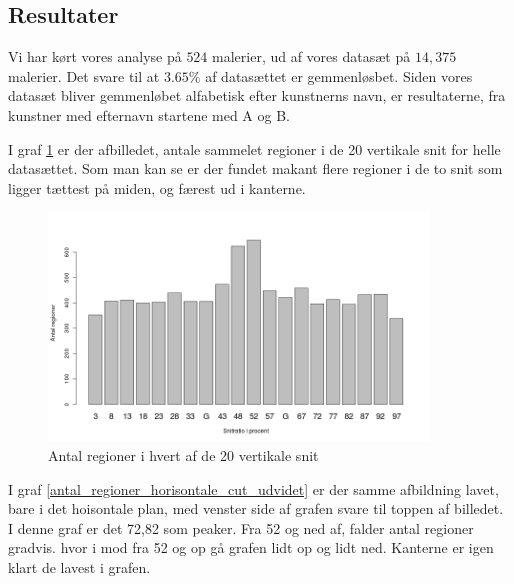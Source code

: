 \subsection{Resultater}
Vi har kørt vores analyse på $524$ malerier, ud af vores datasæt på
$14,375$ malerier. Det svare til at $3.65 \%$ af datasættet er
gemmenløsbet. Siden vores datasæt bliver gemmenløbet alfabetisk efter
kunstnerns navn, er resultaterne, fra kunstner med efternavn startene med A
og B.


I graf \ref{antal_regioner_vertikale_cut_udvidet} er der afbilledet,
antale sammelet regioner i de 20 vertikale snit for helle datasættet.
Som man kan se er der fundet makant flere regioner i de to snit som
ligger tættest på miden, og færest ud i kanterne. 

\begin{figure}[h!]
	\begin{center}
		\includegraphics[width=0.9\textwidth]{afsnit/resultater/billeder/cut0cut1eatsperratioU.png}
	\end{center}
	\caption{Antal regioner i hvert af de 20 vertikale snit}
	\label{antal_regioner_vertikale_cut_udvidet}
\end{figure}

I graf \ref{antal_regioner_horisontale_cut_udvidet} er der samme
afbildning lavet, bare i det hoisontale plan, med venster side af grafen
svare til toppen af billedet. I denne graf er det 72,82 som peaker. Fra
52 og ned af, falder antal regioner gradvis. hvor i mod fra 52 og op gå
grafen lidt op og lidt ned. Kanterne er igen klart de lavest i grafen.

